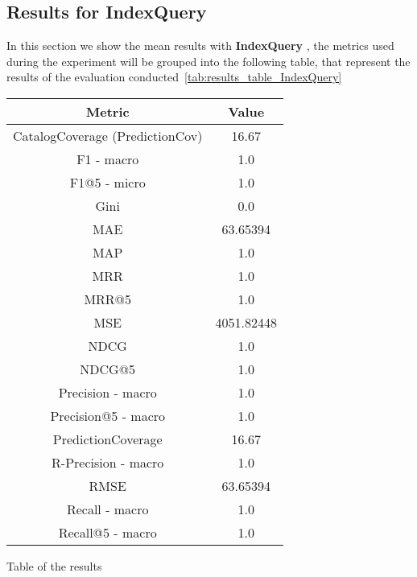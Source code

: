\documentclass[11pt]{article}
\begin{document}
\subsection{Results for IndexQuery}\label{subsec:IndexQuery}
In this section we show the mean results with \textbf{ IndexQuery }, the metrics used during the experiment will be
grouped into the following table, that represent the results of the evaluation conducted~\ref{tab:results_table_IndexQuery}

\begin{center}
    \begin{tabular}{|c|c|}
        \hline
        \textbf{Metric} & \textbf{Value} \\ \hline
                CatalogCoverage (PredictionCov) & 16.67 \\ \hline
                F1 - macro & 1.0 \\ \hline
                F1@5 - micro & 1.0 \\ \hline
                Gini & 0.0 \\ \hline
                MAE & 63.65394 \\ \hline
                MAP & 1.0 \\ \hline
                MRR & 1.0 \\ \hline
                MRR@5 & 1.0 \\ \hline
                MSE & 4051.82448 \\ \hline
                NDCG & 1.0 \\ \hline
                NDCG@5 & 1.0 \\ \hline
                Precision - macro & 1.0 \\ \hline
                Precision@5 - macro & 1.0 \\ \hline
                PredictionCoverage & 16.67 \\ \hline
                R-Precision - macro & 1.0 \\ \hline
                RMSE & 63.65394 \\ \hline
                Recall - macro & 1.0 \\ \hline
                Recall@5 - macro & 1.0 \\ \hline
             \end{tabular}
    \captionsetup{type=table}
    \caption{Table of the results}
    \label{tab:results_table_IndexQuery}
\end{center}
\hfill\break
\hfill\break
\end{document}
